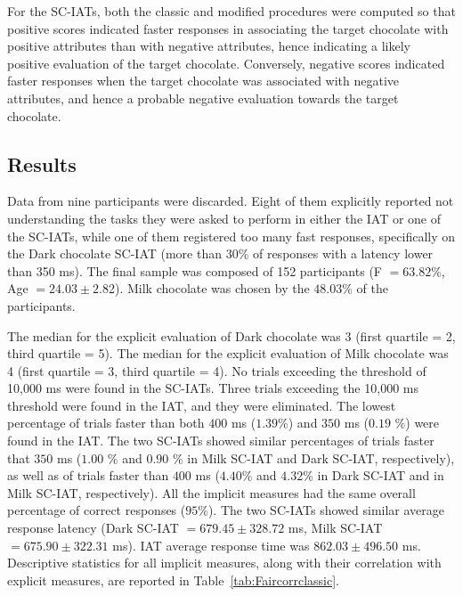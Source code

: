 \documentclass[12pt]{book}
\begin{document}
For the SC-IATs, both the classic and modified procedures were computed so that positive scores indicated faster responses in associating the target chocolate with positive attributes than with negative attributes, hence indicating a likely positive evaluation of the target chocolate. Conversely, negative scores indicated faster responses when the target chocolate was associated with negative attributes, and hence a probable negative evaluation towards the target chocolate.

\subsection{Results}

Data from nine participants were discarded. Eight of them explicitly reported not understanding the tasks they were asked to perform in either the IAT or one of the SC-IATs, while one of them registered too many fast responses, specifically on the Dark chocolate SC-IAT (more than 30\% of responses with a latency lower than 350 ms). The final sample was composed of 152 participants (F $= 63.82$\%, Age $= 24.03 \pm 2.8$2). Milk chocolate was chosen by the $48.03$\% of the participants. 

The median for the explicit evaluation of Dark chocolate was 3 (first quartile = 2, third quartile = 5). The median for the explicit evaluation of Milk chocolate was 4 (first quartile = 3, third quartile = 4). No trials exceeding the threshold of 10,000 ms were found in the SC-IATs. Three trials exceeding the 10,000 ms threshold were found in the IAT, and they were eliminated. 
The lowest percentage of trials faster than both $400$ ms ($1.39$\%) and $350$ ms ($0.19$ \%) were found in the IAT. The two SC-IATs showed similar percentages of trials faster that $350$ ms ($1.00$ \% and $0.90$ \% in Milk SC-IAT and Dark SC-IAT, respectively), as well as of trials faster than $400$ ms ($4.40$\% and $4.32$\% in Dark SC-IAT and in Milk SC-IAT, respectively).
All the implicit measures had the same overall percentage of correct responses ($95$\%).
The two SC-IATs showed similar average response latency (Dark SC-IAT $= 679.45 \pm 328.72$ ms, Milk SC-IAT $= 675.90 \pm 322.31$ ms). IAT average response time was $862.03 \pm 496.50$ ms. Descriptive statistics for all implicit measures, along with their correlation with explicit measures, are reported in Table~\ref{tab:Faircorrclassic}. 
\end{document}

